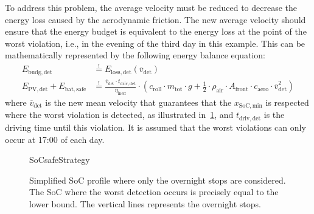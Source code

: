 To address this problem, the average velocity must be reduced to decrease the energy loss caused by the aerodynamic friction. The new average velocity should ensure that the energy budget is equivalent to the energy loss at the point of the worst violation, i.e., in the evening of the third day in this example. This can be mathematically represented by the following energy balance equation:
\begin{align}
	E_\mathrm{budg,det} &\overset{!}{=} E_\mathrm{loss,det}(\overline{v}_\mathrm{det}) \\
	E_\mathrm{PV,det} + E_\mathrm{bat,safe} &\overset{!}{=} \frac{\overline{v}_\mathrm{det} \cdot t_\mathrm{driv,det}}{\eta_\mathrm{ineff}} \cdot \left(c_\mathrm{roll} \cdot m_\mathrm{tot} \cdot g + \frac{1}{2} \cdot \rho_\mathrm{air} \cdot A_\mathrm{front} \cdot c_\mathrm{aero} \cdot \overline{v}_\mathrm{det}^2 \right) \label{eq:strategyEbalanceDetection}
\end{align}
where $\overline{v}_\mathrm{det}$ is the new mean velocity that guarantees that the $x_\mathrm{SoC,min}$ is respected where the worst violation is detected, as illustrated in~\cref{fig:strategySoCsafe}, and $t_\mathrm{driv,det}$ is the driving time until this violation. It is assumed that the worst violations can only occur at 17:00 of each day.
\begin{figure}[htbp]
	\centering
	\begin{externalize}{SoCsafeStrategy}
		
	\end{externalize}
	\caption{Simplified SoC profile where only the overnight stops are considered. The SoC where the worst detection occurs is precisely equal to the lower bound. The vertical lines represents the overnight stops.}
	\label{fig:strategySoCsafe}
\end{figure}

